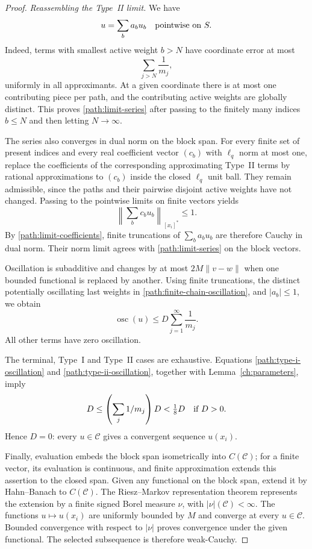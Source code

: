 \begin{proof}
\smallskip\noindent
\emph{Reassembling the Type~II limit.}
We have
\begin{equation}
 u=\sum_b a_bu_b
 \quad\hbox{pointwise on }S.
 \label{path:limit-series}
\end{equation}
Indeed, terms with smallest active weight $b>N$ have coordinate
error at most
\[
 \sum_{j>N}\frac1{m_j},
\]
uniformly in all approximants.  At a given coordinate there is at
most one contributing piece per path, and the contributing active
weights are globally distinct.  This proves
\eqref{path:limit-series} after passing to the finitely many indices
$b\le N$ and then letting $N\to\infty$.

The series also converges in dual norm on the block span.  For every
finite set of present indices and every real coefficient vector
$(c_b)$ with $\ell_q$ norm at most one, replace the coefficients of
the corresponding approximating Type~II terms by rational
approximations to $(c_b)$ inside the closed $\ell_q$ unit ball.
They remain admissible, since the paths
and their pairwise disjoint active weights have not changed.
Passing to the pointwise limits on finite vectors yields
\[
 \left\|\sum_b c_bu_b\right\|_{[x_i]^*}\le1.
\]
By \eqref{path:limit-coefficients}, finite truncations of
$\sum_ba_bu_b$ are therefore Cauchy in dual norm.  Their norm limit
agrees with \eqref{path:limit-series} on the block vectors.

Oscillation is subadditive and changes by at most
$2M\|v-w\|$ when one bounded functional is replaced by another.
Using finite truncations, the distinct potentially oscillating last
weights in \eqref{path:finite-chain-oscillation}, and $|a_b|\le1$,
we obtain
\begin{equation}
 \operatorname{osc}(u)\le D\sum_{j=1}^{\infty}\frac1{m_j}.
 \label{path:type-ii-oscillation}
\end{equation}
All other terms have zero oscillation.

The terminal, Type~I and Type~II cases are exhaustive.  Equations
\eqref{path:type-i-oscillation} and
\eqref{path:type-ii-oscillation}, together with
Lemma~\ref{ch:parameters}, imply
\[
 D\le\left(\sum_j1/m_j\right)D<\tfrac18D
 \quad\hbox{if }D>0.
\]
Hence $D=0$: every $u\in\mathcal C$ gives a convergent sequence
$u(x_i)$.

Finally, evaluation embeds the block span isometrically into
$C(\mathcal C)$; for a finite vector, its evaluation is continuous,
and finite approximation extends this assertion to the closed span.
Given any functional on the block span, extend it by Hahn--Banach to
$C(\mathcal C)$. The Riesz--Markov representation theorem
\cite[Theorem~6.19]{Rudin1987} represents the extension by a finite
signed Borel measure $\nu$, with $|\nu|(\mathcal C)<\infty$.
The functions $u\mapsto u(x_i)$ are uniformly bounded by $M$ and
converge at every $u\in\mathcal C$. Bounded convergence with respect
to $|\nu|$ proves convergence under the given functional.  The selected subsequence is therefore weak-Cauchy.
\end{proof}
